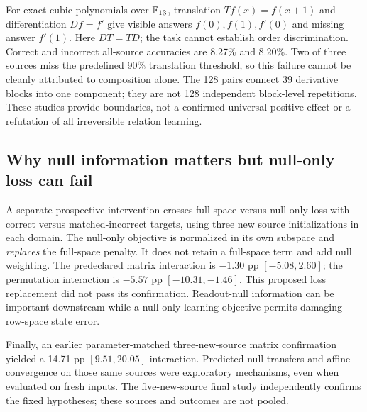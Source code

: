 For exact cubic polynomials over $\mathbb{F}_{13}$, translation $Tf(x)=f(x+1)$ and differentiation $Df=f'$ give visible answers $f(0),f(1),f'(0)$ and missing answer $f'(1)$. Here $DT=TD$; the task cannot establish order discrimination.
Correct and incorrect all-source accuracies are 8.27\% and 8.20\%.
Two of three sources miss the predefined 90\% translation threshold, so this failure cannot be cleanly attributed to composition alone.
The 128 pairs connect 39 derivative blocks into one component; they are not 128 independent block-level repetitions.
These studies provide boundaries, not a confirmed universal positive effect or a refutation of all irreversible relation learning.

\subsection{Why null information matters but null-only loss can fail}
A separate prospective intervention crosses full-space versus null-only loss with correct versus matched-incorrect targets, using three new source initializations in each domain.
The null-only objective is normalized in its own subspace and \emph{replaces} the full-space penalty.
It does not retain a full-space term and add null weighting.
The predeclared matrix interaction is $-1.30$ pp $[-5.08,2.60]$; the permutation interaction is $-5.57$ pp $[-10.31,-1.46]$.
This proposed loss replacement did not pass its confirmation.
Readout-null information can be important downstream while a null-only learning objective permits damaging row-space state error.

Finally, an earlier parameter-matched three-new-source matrix confirmation yielded a 14.71 pp $[9.51,20.05]$ interaction. Predicted-null transfers and affine convergence on those same sources were exploratory mechanisms, even when evaluated on fresh inputs. The five-new-source final study independently confirms the fixed hypotheses; these sources and outcomes are not pooled.
